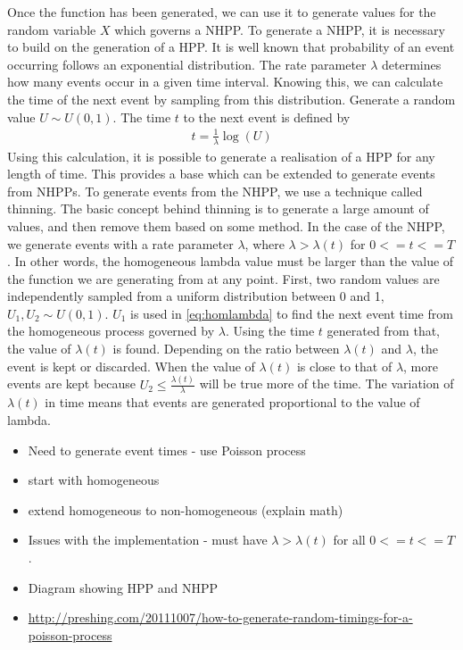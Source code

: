 \documentclass[a4paper,11pt]{article}
\begin{document}
   Once the function has been generated, we can use it to generate values for
   the random variable $X$ which governs a NHPP. To generate a NHPP, it is
   necessary to build on the generation of a HPP. It is well known that
   probability of an event occurring follows an exponential distribution. The
   rate parameter $\lambda$ determines how many events occur in a given time
   interval. Knowing this, we can calculate the time of the next event by
   sampling from this distribution. Generate a random value $U\sim U(0,1)$. The
   time $t$ to the next event is defined by
   \begin{align}\label{eq:homlambda}
   t=\frac{1}{\lambda}\log(U)
   \end{align}
   Using this calculation, it is possible to generate a realisation of a HPP for
   any length of time. This provides a base which can be extended to generate
   events from NHPPs. To generate events from the NHPP, we use a technique
   called thinning. The basic concept behind thinning is to generate a large
   amount of values, and then remove them based on some method. In the case of
   the NHPP, we generate events with a rate parameter $\lambda$, where
   $\lambda>\lambda(t)$ for $0<=t<=T$. In other words, the homogeneous lambda
   value must be larger than the value of the function we are generating from at
   any point. First, two random values are independently sampled from a uniform
   distribution between 0 and 1, $U_1,U_2\sim U(0,1)$. $U_1$ is used in
   \eqref{eq:homlambda} to find the next event time from the homogeneous process
   governed by $\lambda$. Using the time $t$ generated from that, the value of
   $\lambda(t)$ is found. Depending on the ratio between $\lambda(t)$ and
   $\lambda$, the event is kept or discarded. When the value of $\lambda(t)$ is
   close to that of $\lambda$, more events are kept because
   $U_2\leq\frac{\lambda(t)}{\lambda}$ will be true more of the time. The
   variation of $\lambda(t)$ in time means that events are generated
   proportional to the value of lambda.

\begin{itemize}
\item Need to generate event times - use Poisson process
\item start with homogeneous
\item extend homogeneous to non-homogeneous (explain math)
\item Issues with the implementation - must have $\lambda>\lambda(t)$ for all
  $0<=t<=T$.
\item Diagram showing HPP and NHPP
\item \href{http://preshing.com/20111007/how-to-generate-random-timings-for-a-poisson-process}{http://preshing.com/20111007/how-to-generate-random-timings-for-a-poisson-process}
\end{itemize}
\end{document}
